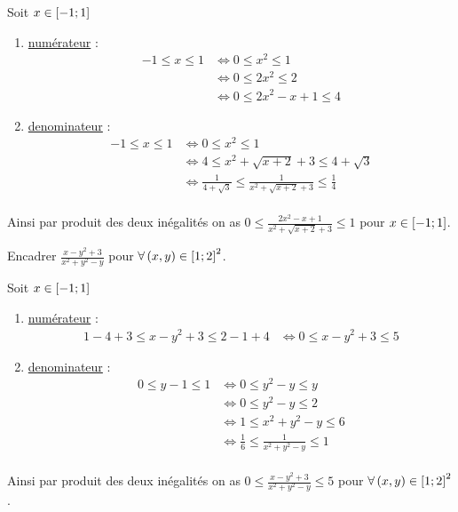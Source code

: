 \begin{corr}
	Soit \(x \in \left[-1;1\right] \)
	\begin{enumerate}
		\item \underline{numérateur} :
		      \[\begin{aligned}
				      -1 \leq x\leq 1 & \iff 0 \leq x^2 \leq 1      \\
				                      & \iff 0 \leq 2x^2 \leq 2     \\
				                      & \iff 0 \leq 2x^2-x+1 \leq 4
			      \end{aligned}
		      \]

		\item \underline{denominateur} : \[\begin{aligned}
				      -1 \leq x\leq 1 & \iff 0 \leq x^2 \leq 1                                                      \\
				                      & \iff 4 \leq x^2 +\sqrt{x+2}+3 \leq 4+\sqrt{3}                               \\
				                      & \iff \frac{1}{4+\sqrt{3}} \leq \frac{1}{x^2 +\sqrt{x+2}+3 }\leq \frac{1}{4} \\
			      \end{aligned}
		      \]
	\end{enumerate}
	Ainsi par produit des deux inégalités on as \(0\leq\frac{2x^2-x+1}{x^2+\sqrt{x+2}+3}\leq1\) pour \(x \in \left[-1;1\right]\).
\end{corr}

\begin{exoex}
	Encadrer \(\frac{x-y^2+3}{x^2+y^2-y}\) pour \(\forall \left(x,y\right) \in \left[1;2\right]^2\).
\end{exoex}

\begin{corr}
	Soit \(x \in \left[-1;1\right] \)
	\begin{enumerate}
		\item \underline{numérateur} :
		      \[\begin{aligned}
				      1-4+3\leq x-y^2+3 \leq 2-1+4 & \iff 0 \leq x-y^2+3 \leq 5
			      \end{aligned}
		      \]

		\item \underline{denominateur} : \[\begin{aligned}
				      0 \leq y-1\leq 1 & \iff 0 \leq y^2-y \leq y                        \\
				                       & \iff 0 \leq y^2-y \leq 2                        \\
				                       & \iff 1 \leq x^2+y^2-y\leq 6                     \\
				                       & \iff \frac{1}{6} \leq \frac{1}{x^2+y^2-y}\leq 1 \\
			      \end{aligned}
		      \]
	\end{enumerate}
	Ainsi par produit des deux inégalités on as \(0\leq \frac{x-y^2+3}{x^2+y^2-y} \leq 5\) pour \(\forall \left(x,y\right) \in \left[1;2\right]^2\).
\end{corr}


